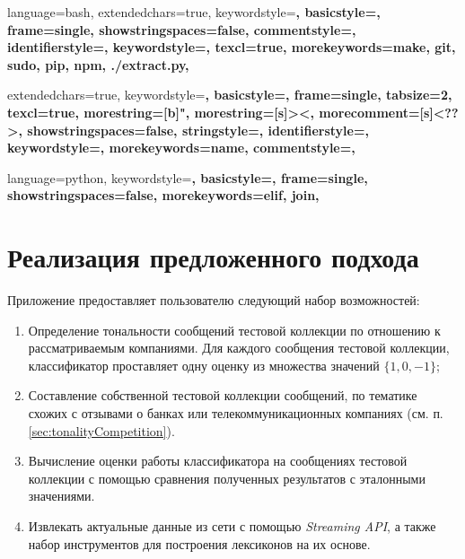 
{
    language=bash,
    extendedchars=true,
    keywordstyle=\bfseries,
    basicstyle=\footnotesize,
    frame=single,
    showstringspaces=false,
    commentstyle=\color{red},
    identifierstyle=\color{black},
    keywordstyle=\color{blue},
    texcl=true,
    morekeywords={make, git, sudo, pip, npm, ./extract.py},
}

{
    extendedchars=true,
    keywordstyle=\bfseries,
    basicstyle=\footnotesize,
    frame=single,
    tabsize=2,
    texcl=true,
    morestring=[b]",
    morestring=[s]{>}{<},
    morecomment=[s]{<?}{?>},
    showstringspaces=false,
    stringstyle=\color{black},
    identifierstyle=\color{darkblue},
    keywordstyle=\color{cyan},
    morekeywords={name},
    commentstyle=\color{gray},
}

{
    language=python,
    keywordstyle=\bfseries,
    basicstyle=\footnotesize,
    frame=single,
    showstringspaces=false,
    morekeywords={elif, join},
}
\newcommand\xml{{\it XML }}

\newpage
\section{Реализация предложенного подхода}
    Приложение предоставляет пользователю следующий набор возможностей:
    \begin{enumerate}
        \item Определение тональности сообщений тестовой коллекции по отношению к
        рассматриваемым компаниями. Для каждого сообщения тестовой коллекции,
        классификатор проставляет одну оценку из множества значений $\{1, 0, -1\}$;
        \item Составление собственной тестовой коллекции сообщений, по тематике
        схожих с отзывами о банках или телекоммуникационных компаниях
        (см. п. \ref{sec:tonalityCompetition}).
        \item Вычисление оценки работы классификатора на сообщениях тестовой
        коллекции с помощью сравнения полученных результатов с эталонными значениями.
        \item Извлекать актуальные данные из сети \twitter с помощью
        {\it Streaming API}, а также набор инструментов для построения лексиконов
        на их основе.
    \end{enumerate}

    

    


